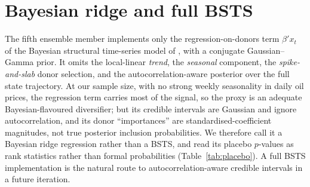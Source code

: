 \section{Bayesian ridge and full BSTS}\label{app:bsts}
The fifth ensemble member implements only the regression-on-donors term $\beta'x_t$ of the
Bayesian structural time-series model of \citet{brodersen2015}, with a conjugate
Gaussian--Gamma prior. It omits the local-linear \emph{trend}, the \emph{seasonal}
component, the \emph{spike-and-slab} donor selection, and the autocorrelation-aware
posterior over the full state trajectory. At our sample size, with no strong weekly
seasonality in daily oil prices, the regression term carries most of the signal, so the
proxy is an adequate Bayesian-flavoured diversifier; but its credible intervals are Gaussian
and ignore autocorrelation, and its donor ``importances'' are standardised-coefficient
magnitudes, not true posterior inclusion probabilities. We therefore call it a Bayesian
ridge regression rather than a BSTS, and read its placebo $p$-values as rank statistics
rather than formal probabilities (Table~\ref{tab:placebo}). A full BSTS implementation is the
natural route to autocorrelation-aware credible intervals in a future iteration.

